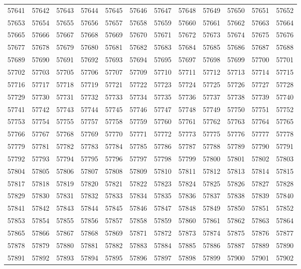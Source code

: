 \begin{center}
\begin{longtable}{llllllllllll}
57641 &57642 &57643 &57644 &57645 &57646 &57647 &57648 &57649 &57650 &57651 &57652 \\
57653 &57654 &57655 &57656 &57657 &57658 &57659 &57660 &57661 &57662 &57663 &57664 \\
57665 &57666 &57667 &57668 &57669 &57670 &57671 &57672 &57673 &57674 &57675 &57676 \\
57677 &57678 &57679 &57680 &57681 &57682 &57683 &57684 &57685 &57686 &57687 &57688 \\
57689 &57690 &57691 &57692 &57693 &57694 &57695 &57697 &57698 &57699 &57700 &57701 \\
57702 &57703 &57705 &57706 &57707 &57709 &57710 &57711 &57712 &57713 &57714 &57715 \\
57716 &57717 &57718 &57719 &57721 &57722 &57723 &57724 &57725 &57726 &57727 &57728 \\
57729 &57730 &57731 &57732 &57733 &57734 &57735 &57736 &57737 &57738 &57739 &57740 \\
57741 &57742 &57743 &57744 &57745 &57746 &57747 &57748 &57749 &57750 &57751 &57752 \\
57753 &57754 &57755 &57757 &57758 &57759 &57760 &57761 &57762 &57763 &57764 &57765 \\
57766 &57767 &57768 &57769 &57770 &57771 &57772 &57773 &57775 &57776 &57777 &57778 \\
57779 &57781 &57782 &57783 &57784 &57785 &57786 &57787 &57788 &57789 &57790 &57791 \\
57792 &57793 &57794 &57795 &57796 &57797 &57798 &57799 &57800 &57801 &57802 &57803 \\
57804 &57805 &57806 &57807 &57808 &57809 &57810 &57811 &57812 &57813 &57814 &57815 \\
57817 &57818 &57819 &57820 &57821 &57822 &57823 &57824 &57825 &57826 &57827 &57828 \\
57829 &57830 &57831 &57832 &57833 &57834 &57835 &57836 &57837 &57838 &57839 &57840 \\
57841 &57842 &57843 &57844 &57845 &57846 &57847 &57848 &57849 &57850 &57851 &57852 \\
57853 &57854 &57855 &57856 &57857 &57858 &57859 &57860 &57861 &57862 &57863 &57864 \\
57865 &57866 &57867 &57868 &57869 &57871 &57872 &57873 &57874 &57875 &57876 &57877 \\
57878 &57879 &57880 &57881 &57882 &57883 &57884 &57885 &57886 &57887 &57889 &57890 \\
57891 &57892 &57893 &57894 &57895 &57896 &57897 &57898 &57899 &57900 &57901 &57902 \\

\end{longtable}
\end{center}
